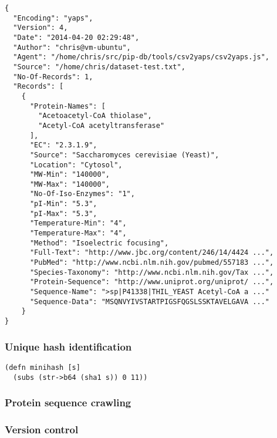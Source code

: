 \lstset{language=JavaScript}
\begin{lstlisting}[label=lst:yaps-example,caption={%
      [Example YAPS encoded dataset]
      An example YAPS encoded dataset, containing a single record.}]
{
  "Encoding": "yaps",
  "Version": 4,
  "Date": "2014-04-20 02:29:48",
  "Author": "chris@vm-ubuntu",
  "Agent": "/home/chris/src/pip-db/tools/csv2yaps/csv2yaps.js",
  "Source": "/home/chris/dataset-test.txt",
  "No-Of-Records": 1,
  "Records": [
    {
      "Protein-Names": [
        "Acetoacetyl-CoA thiolase",
        "Acetyl-CoA acetyltransferase"
      ],
      "EC": "2.3.1.9",
      "Source": "Saccharomyces cerevisiae (Yeast)",
      "Location": "Cytosol",
      "MW-Min": "140000",
      "MW-Max": "140000",
      "No-Of-Iso-Enzymes": "1",
      "pI-Min": "5.3",
      "pI-Max": "5.3",
      "Temperature-Min": "4",
      "Temperature-Max": "4",
      "Method": "Isoelectric focusing",
      "Full-Text": "http://www.jbc.org/content/246/14/4424 ...",
      "PubMed": "http://www.ncbi.nlm.nih.gov/pubmed/557183 ...",
      "Species-Taxonomy": "http://www.ncbi.nlm.nih.gov/Tax ...",
      "Protein-Sequence": "http://www.uniprot.org/uniprot/ ...",
      "Sequence-Name": ">sp|P41338|THIL_YEAST Acetyl-CoA a ..."
      "Sequence-Data": "MSQNVYIVSTARTPIGSFQGSLSSKTAVELGAVA ..."
    }
}
\end{lstlisting}

\subsubsection*{Unique hash identification}


\begin{verbatim}
(defn minihash [s]
  (subs (str->b64 (sha1 s)) 0 11))
\end{verbatim}


\subsubsection*{Protein sequence crawling}



\subsubsection*{Version control}




